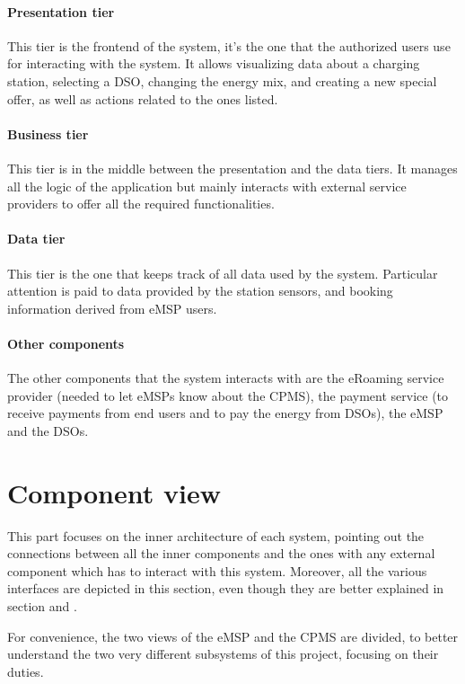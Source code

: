 \paragraph{Presentation tier} This tier is the frontend of the system, it's the one that the authorized users use for interacting with the system. It allows visualizing data about a charging station, selecting a DSO, changing the energy mix, and creating a new special offer, as well as actions related to the ones listed. 

\paragraph{Business tier} This tier is in the middle between the presentation and the data tiers. It manages all the logic of the application but mainly interacts with external service providers to offer all the required functionalities.

\paragraph{Data tier} This tier is the one that keeps track of all data used by the system. Particular attention is paid to data provided by the station sensors, and booking information derived from eMSP users.

\paragraph{Other components} The other components that the system interacts with are the eRoaming service provider (needed to let eMSPs know about the CPMS), the payment service (to receive payments from end users and to pay the energy from DSOs), the eMSP and the DSOs.

\section{Component view}

This part focuses on the inner architecture of each system, pointing out the connections between all the inner components and the ones with any external component which has to interact with this system. Moreover, all the various interfaces are depicted in this section, even though they are better explained in section  and .\medskip

For convenience, the two views of the eMSP and the CPMS are divided, to better understand the two very different subsystems of this project, focusing on their duties.

